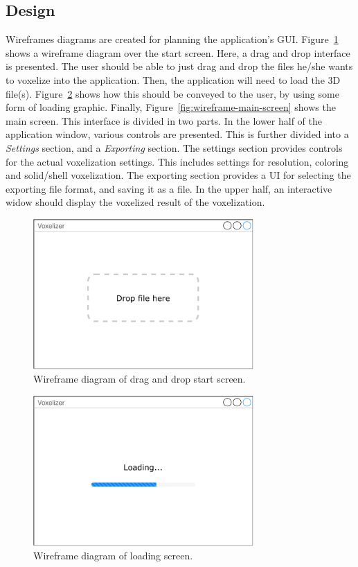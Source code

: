 \subsection{Design}
Wireframes diagrams are created for planning the application's GUI. Figure~\ref{fig:wireframe-dnd} shows a wireframe diagram over the start screen. Here, a drag and drop interface is presented. The user should be able to just drag and drop the files he/she wants to voxelize into the application. Then, the application will need to load the 3D file(s). Figure~\ref{fig:wireframe-loading} shows how this should be conveyed to the user, by using some form of loading graphic. Finally, Figure~\ref{fig:wireframe-main-screen} shows the main screen. This interface is divided in two parts. In the lower half of the application window, various controls are presented. This is further divided into a \textit{Settings} section, and a \textit{Exporting} section. The settings section provides controls for the actual voxelization settings. This includes settings for resolution, coloring and solid/shell voxelization. The exporting section provides a UI for selecting the exporting file format, and saving it as a file. In the upper half, an interactive widow should display the voxelized result of the voxelization.
\begin{figure}[htp]
    \centering
    \includegraphics[width=0.75\textwidth]{sections/methodology/figures/wireframes/wireframe-dnd.pdf}
    \caption{Wireframe diagram of drag and drop start screen.}
    \label{fig:wireframe-dnd}
\end{figure}
\begin{figure}[htp]
    \centering
    \includegraphics[width=0.75\textwidth]{sections/methodology/figures/wireframes/wireframe-loading.pdf}
    \caption{Wireframe diagram of loading screen.}
    \label{fig:wireframe-loading}
\end{figure}

